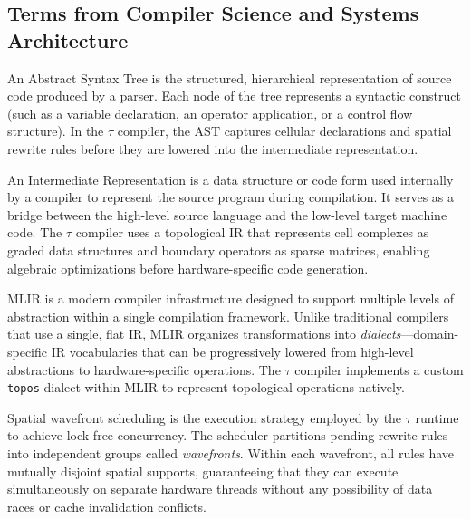 \documentclass[manuscript, nonacm, review=false]{acmart}
\theoremstyle{definition}
\theoremstyle{plain}
\newcommand{\toposLang}{\ensuremath{\tau}\text{-Lang}}
\begin{document}
\subsection{Terms from Compiler Science and Systems Architecture}
\label{subsec:terms_compiler}

\begin{description}[style=unboxed, leftmargin=0cm, font=\bfseries]

\item[Abstract Syntax Tree (AST)]
An Abstract Syntax Tree is the structured, hierarchical representation of source code produced by a parser. Each node of the tree represents a syntactic construct (such as a variable declaration, an operator application, or a control flow structure). In the \toposLang{} compiler, the AST captures cellular declarations and spatial rewrite rules before they are lowered into the intermediate representation.

\item[Intermediate Representation (IR)]
An Intermediate Representation is a data structure or code form used internally by a compiler to represent the source program during compilation. It serves as a bridge between the high-level source language and the low-level target machine code. The \toposLang{} compiler uses a topological IR that represents cell complexes as graded data structures and boundary operators as sparse matrices, enabling algebraic optimizations before hardware-specific code generation.

\item[Multi-Level Intermediate Representation (MLIR)]
MLIR is a modern compiler infrastructure designed to support multiple levels of abstraction within a single compilation framework. Unlike traditional compilers that use a single, flat IR, MLIR organizes transformations into \emph{dialects}---domain-specific IR vocabularies that can be progressively lowered from high-level abstractions to hardware-specific operations. The \toposLang{} compiler implements a custom \texttt{topos} dialect within MLIR to represent topological operations natively.

\item[Spatial Wavefront Scheduling]
Spatial wavefront scheduling is the execution strategy employed by the \toposLang{} runtime to achieve lock-free concurrency. The scheduler partitions pending rewrite rules into independent groups called \emph{wavefronts}. Within each wavefront, all rules have mutually disjoint spatial supports, guaranteeing that they can execute simultaneously on separate hardware threads without any possibility of data races or cache invalidation conflicts.


\end{description}
\end{document}
